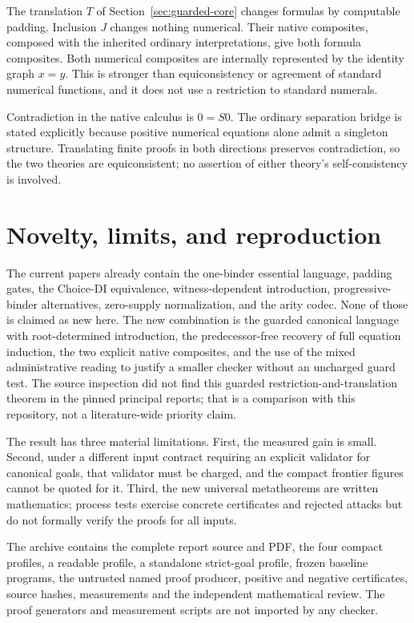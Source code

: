 \documentclass[11pt,letterpaper]{article}
\theoremstyle{definition}\newtheorem{definition}[theorem]{Definition}
\theoremstyle{remark}\newtheorem{remark}[theorem]{Remark}
\begin{document}
The translation \(T\) of Section~\ref{sec:guarded-core} changes formulas
by computable padding. Inclusion \(J\) changes nothing numerical.
Their native composites, composed with the inherited ordinary
interpretations, give both formula composites. Both numerical composites
are internally represented by the identity graph \(x=y\). This is
stronger than equiconsistency or agreement of standard numerical
functions, and it does not use a restriction to standard numerals.

Contradiction in the native calculus is \(0=S0\). The ordinary
separation bridge is stated explicitly because positive numerical
equations alone admit a singleton structure. Translating finite proofs
in both directions preserves contradiction, so the two theories are
equiconsistent; no assertion of either theory's self-consistency is
involved.



\section{Novelty, limits, and reproduction}
\label{sec:limits}
The current papers already contain the one-binder essential language,
padding gates, the Choice-DI equivalence, witness-dependent introduction,
progressive-binder alternatives, zero-supply normalization, and the arity
codec. None of those is claimed as new here. The new combination is the
guarded canonical language with root-determined introduction, the
predecessor-free recovery of full equation induction, the two explicit
native composites, and the use of the mixed administrative reading to
justify a smaller checker without an uncharged guard test. The source
inspection did not find this guarded restriction-and-translation theorem
in the pinned principal reports; that is a comparison with this
repository, not a literature-wide priority claim.

The result has three material limitations. First, the measured gain is
small. Second, under a different input contract requiring an explicit
validator for canonical goals, that validator must be charged, and the
compact frontier figures cannot be quoted for it. Third, the new
universal metatheorems are written mathematics; process tests exercise
concrete certificates and rejected attacks but do not formally verify
the proofs for all inputs.

The archive contains the complete report source and PDF, the four compact
profiles, a readable profile, a standalone strict-goal profile, frozen
baseline programs, the untrusted named proof producer, positive and
negative certificates, source hashes, measurements and the independent
mathematical review. The proof generators and measurement scripts are
not imported by any checker.
\end{document}
